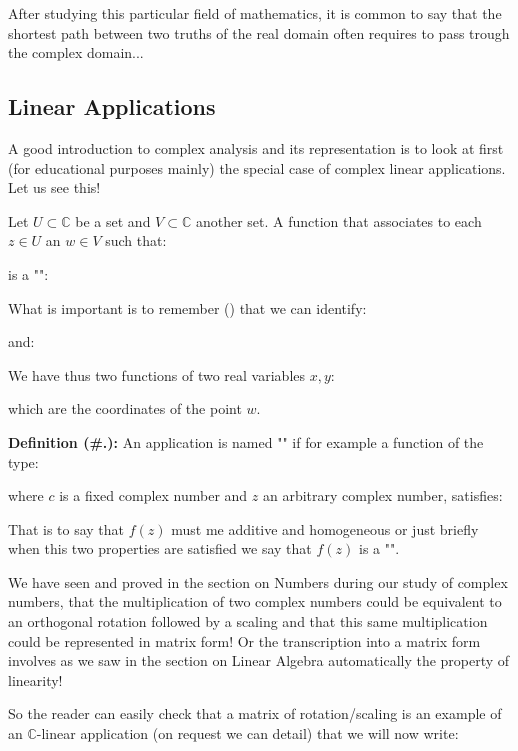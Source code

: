 	After studying this particular field of mathematics, it is common to say that the shortest path between two truths of the real domain often requires to pass trough the complex domain...

	\subsection{Linear Applications}

	A good introduction to complex analysis and its representation is to look at first (for educational purposes mainly) the special case of complex linear applications. Let us see this!

	Let $U \subset \mathbb{C}$ be a set and $V \subset \mathbb{C}$ another set. A function that associates to each $z \in U$ an $w \in V$ such that:
	
	is a "":
	
	What is important is to remember () that we can identify:
	
	and:
	
	We have thus two functions of two real variables $x, y$:
	
	which are the coordinates of the point $w$.

	\textbf{Definition (\#\thesection.\mydef):} An application is named "" if for example a function of the type:
	
	where $c$ is a fixed complex number and $z$ an arbitrary complex number, satisfies:
	
	That is to say that $f(z)$ must me additive and homogeneous or just briefly when this two properties are satisfied we say that $f(z)$ is a "".

	We have seen and proved in the section on Numbers during our study of complex numbers, that the multiplication of two complex numbers could be equivalent to an orthogonal rotation followed by a scaling and that this same multiplication could be represented in matrix form! Or the transcription into a matrix form involves as we saw in the section on Linear Algebra automatically  the property of linearity!

	So the reader can easily check that a matrix of rotation/scaling is an example of an $\mathbb{C}$-linear application (on request we can detail) that we will now write:
	
